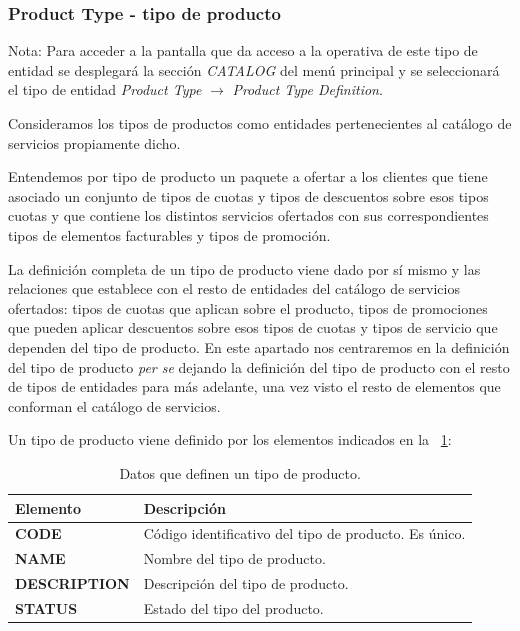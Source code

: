\subsubsection{Product Type - tipo de producto}
\label{sub:product-type}

Nota: Para acceder a la pantalla que da acceso a la operativa de este tipo de entidad se desplegará la sección \emph{CATALOG} del menú principal y se seleccionará el tipo de entidad \emph{Product Type} $\rightarrow$ \emph{Product Type Definition}.

Consideramos los tipos de productos como entidades pertenecientes al catálogo de servicios propiamente dicho.

Entendemos por tipo de producto un paquete a ofertar a los clientes que tiene asociado un conjunto de tipos de cuotas y tipos de descuentos sobre esos tipos cuotas y que contiene los distintos servicios ofertados con sus correspondientes tipos de elementos facturables y tipos de promoción.

La definición completa de un tipo de producto viene dado por sí mismo y las relaciones que establece con el resto de entidades del catálogo de servicios ofertados: tipos de cuotas que aplican sobre el producto, tipos de promociones que pueden aplicar descuentos sobre esos tipos de cuotas y tipos de servicio que dependen del tipo de producto. En este apartado nos centraremos en la definición del tipo de producto \textit{per se} dejando la definición del tipo de producto con el resto de tipos de entidades para más adelante, una vez visto el resto de elementos que conforman el catálogo de servicios.

Un tipo de producto viene definido por los elementos indicados en la \tablename~\ref{tab:tipo-producto}:



\begin{table}[H]
  \centering
  \setlength{\leftmargini}{0.4cm}
  \resizebox{14cm}{!} {
  \begin{tabular}{|m{3cm} m{11cm}|}
  \rowcolor{udcpink!25}
  \hline
  	\textbf{Elemento} & \textbf{Descripción} \\\hline
	\textbf{CODE} & Código identificativo del tipo de producto. Es único.   \\
	\textbf{NAME} & Nombre del tipo de producto. \\
	\textbf{DESCRIPTION} & Descripción del tipo de producto. \\		
	\textbf{STATUS} & Estado del tipo del producto.
	\\\hline
  \end{tabular}
  } %
  \caption{Datos que definen un tipo de producto.}
  \label{tab:tipo-producto}
\end{table}

